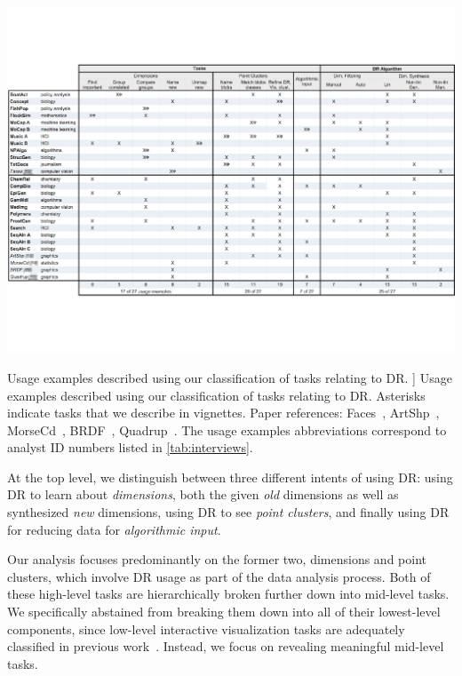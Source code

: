 \begin{table}
    \centering
    \includegraphics[width=\textwidth]{figures/dritw-table-2.pdf}
    \caption
    [
        Usage examples described using our classification of tasks relating to \ac{DR}. 
    ]
    {
        Usage examples described using our classification of tasks relating to \ac{DR}. Asterisks indicate tasks that we describe in vignettes. Paper references: {\sc Faces}~\cite{Tenenbaum2000}, {\sc ArtShp}~\cite{Bronstein2006}, {\sc MorseCd}~\cite{Buja2002}, {\sc BRDF}~\cite{Matusik2003}, {\sc Quadrup}~\cite{Reveret2005}. The usage examples abbreviations correspond to analyst ID numbers listed in \autoref{tab:interviews}. 
    }
    \label{table:dritw-table-2}
    \centering
\end{table}


At the top level, we distinguish between three different intents of using \ac{DR}: using \ac{DR} to learn about {\it dimensions}, both the given {\it old} dimensions as well as synthesized {\it new} dimensions, using \ac{DR} to see {\it point clusters}, and finally using \ac{DR} for reducing data for {\it algorithmic input}. 

Our analysis focuses predominantly on the former two, dimensions and point clusters, which involve \ac{DR} usage as part of the data analysis process. 
Both of these high-level tasks are hierarchically broken further down into mid-level tasks.
We specifically abstained from breaking them down into all of their lowest-level components, since low-level interactive visualization tasks are adequately classified in previous work~\cite{Amar2005,Shneiderman1996,Yi2007}.
Instead, we focus on revealing meaningful mid-level tasks. 

